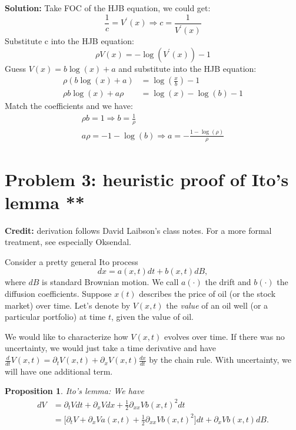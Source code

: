 \documentclass[11pt]{extarticle}
\theoremstyle{plain}
\newtheorem{prop}[thm]{Proposition}
\theoremstyle{definition}
\begin{document}
\begin{enumerate}
\textbf{Solution:} Take FOC of the HJB equation, we could get:
$$
\frac{1}{c}=V^{\prime}(x) \Rightarrow c=\frac{1}{V^{\prime}(x)}
$$
Substitute c into the HJB equation:
$$
\rho V(x)=-\log \left(V^{\prime}(x)\right)-1
$$
Guess $V(x)=b \log (x)+a$ and substitute into the HJB equation:
$$
\begin{aligned}
\rho(b \log (x)+a) &=\log \left(\frac{x}{b}\right)-1 \\
\rho b \log (x)+a \rho &=\log (x)-\log (b)-1
\end{aligned}
$$
Match the coefficients and we have:
$$
\begin{array}{r}
\rho b=1 \Rightarrow b=\frac{1}{\rho} \\
a \rho=-1-\log (b) \Rightarrow a=-\frac{1-\log (\rho)}{\rho}
\end{array}
$$

\end{enumerate}




\vspace{10mm}
\section*{Problem 3: heuristic proof of Ito's lemma **}

\textbf{Credit:} derivation follows David Laibson's class notes. For a more formal treatment, see especially Oksendal. 

\vspace{5mm}
\noindent
Consider a pretty general Ito process
\begin{equation*}
	dx = a(x, t) dt + b(x, t) dB,
\end{equation*}
where $dB$ is standard Brownian motion. We call $a(\cdot)$ the drift and $b(\cdot)$ the diffusion coefficients. Suppose $x(t)$ describes the price of oil (or the stock market) over time. Let's denote by $V(x, t)$ the \textit{value} of an oil well (or a particular portfolio) at time $t$, given the value of oil. 

We would like to characterize how $V(x, t)$ evolves over time. If there was no uncertainty, we would just take a time derivative and have $\frac{d}{dt} V(x, t) = \partial_t V(x, t) + \partial_x V(x, t) \frac{dx}{dt}$ by the chain rule. With uncertainty, we will have one additional term. 

\begin{prop}
	Ito's lemma: We have 
	\begin{align*}
		dV &= \partial_t V dt + \partial_x V dx + \frac{1}{2} \partial_{xx} V b(x, t)^2 dt \\
		&= \bigg[ \partial_t V + \partial_x V a(x, t) + \frac{1}{2} \partial_{xx} V b(x, t)^2\bigg] dt + \partial_x V b(x, t) dB.
	\end{align*}
\end{prop}
\end{document}
